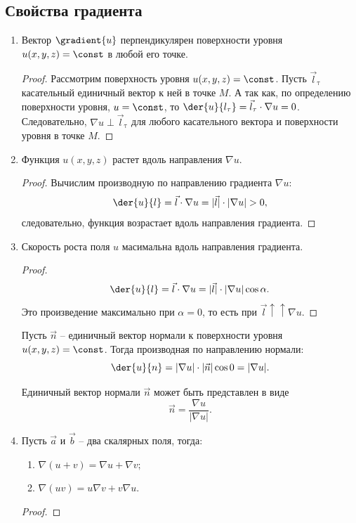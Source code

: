	\subsection{Свойства градиента}
	\begin{enumerate}
	\item Вектор \( \gradient{u} \) перпендикулярен поверхности уровня \( u(x, y, z) = \const \) в любой его точке.	
	\begin{proof}
	
	Рассмотрим поверхность уровня \( u(x, y, z) =\const \). Пусть \( \vec{l}_\mathrm{\tau} \) касательный единичный вектор к ней в точке \( M \). А так как, по определению поверхности уровня, \( u = \const \), то \( \der{u}{l_\mathrm{\tau}} = \vec{l}_\mathrm{\tau}\cdot\nabla u = 0 \). Следовательно, \( \nabla u \perp \vec{l}_\mathrm{\tau} \) для любого касательного вектора и поверхности уровня в точке \( M \).
	\end{proof}
	
	\item Функция \( u(x, y, z) \) растет вдоль направления \( \nabla u \).
	\begin{proof}
	
	Вычислим производную по направлению градиента \( \nabla u \):
	\[ \der{u}{l} = \vec{l}\cdot\nabla u = |\vec{l}|\cdot|\nabla u| > 0, \]
	следовательно, функция возрастает вдоль направления градиента.
	\end{proof}
	
	\item Скорость роста поля \( u \) масимальна вдоль направления градиента.
	\begin{proof}
	
	\[ \der{u}{l} = \vec{l}\cdot\nabla u = |\vec{l}|\cdot|\nabla u|\cos\alpha. \]
	Это произведение максимально при \( \alpha = 0 \), то есть при \( \vec{l} \uparrow\uparrow \nabla u \).
	\end{proof}
	\begin{corollary}
	Пусть \( \vec{n} \) -- единичный вектор нормали к поверхности уровня \( u(x, y, z) = \const \). Тогда производная по направлению нормали:
	\[ \der{u}{n} = |\nabla u|\cdot|\vec{n}|\cos0 = |\nabla u|. \]
	\end{corollary}
	\begin{corollary}
	Единичный вектор нормали \( \vec{n} \) может быть представлен в виде
	\[ \vec{n} = \frac{\nabla u}{|\nabla u|}. \]
	\end{corollary}
	
	\item Пусть \( \vec{a} \) и \( \vec{b} \) -- два скалярных поля, тогда:
	\begin{enumerate}
	\item \( \nabla(u + v) = \nabla u + \nabla v; \)
	\item \( \nabla(uv) = u\nabla v + v\nabla u. \)
	\end{enumerate}
	\begin{proof}
	

\end{proof}
\end{enumerate}
